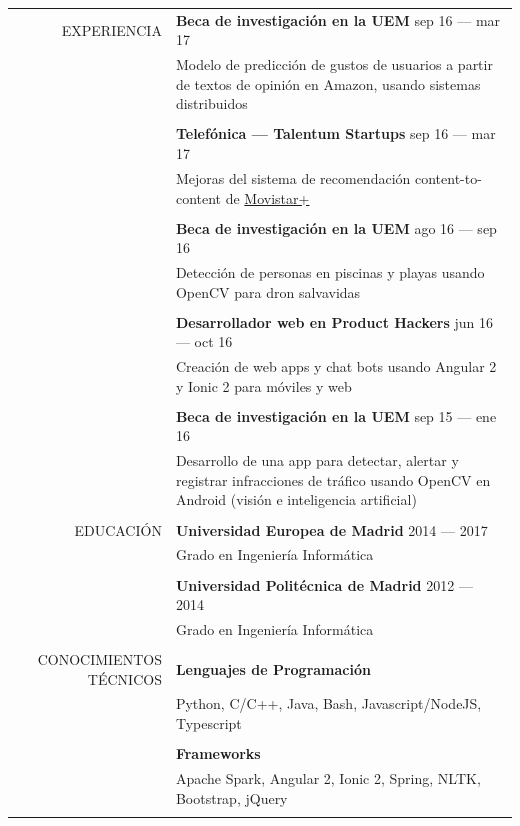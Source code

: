 \documentclass[a4paper, 11pt]{article}
\begin{document}
\begin{longtable}{rp{11cm}}
    EXPERIENCIA
    & {\bf Beca de investigación en la UEM} \hfill sep 16 --- mar 17\\
    & Modelo de predicción de gustos de usuarios a partir de textos de opinión en Amazon, usando sistemas distribuidos\\
    \\
    & {\bf Telefónica --- Talentum Startups} \hfill sep 16 --- mar 17\\
    & Mejoras del sistema de recomendación content-to-content de \href{http://ver.movistarplus.es/}{Movistar+}\\
    \\
    & {\bf Beca de investigación en la UEM} \hfill ago 16 --- sep 16\\
    & Detección de personas en piscinas y playas usando OpenCV para dron salvavidas\\
    \\
    & {\bf Desarrollador web en Product Hackers} \hfill jun 16 --- oct 16\\
    & Creación de web apps y chat bots usando Angular 2 y Ionic 2 para móviles y web\\
    \\
    & {\bf Beca de investigación en la UEM} \hfill sep 15 --- ene 16\\
    & Desarrollo de una app para detectar, alertar y registrar infracciones de tráfico usando OpenCV en Android (visión e inteligencia artificial)\\
    \\
    EDUCACIÓN
    & {\bf Universidad Europea de Madrid} \hfill 2014 --- 2017\\
    & Grado en Ingeniería Informática\\
    \\
    & {\bf Universidad Politécnica de Madrid} \hfill 2012 --- 2014\\
    & Grado en Ingeniería Informática\\
    \\
    CONOCIMIENTOS TÉCNICOS
    & {\bf Lenguajes de Programación}\\
    & Python, C/C++, Java, Bash, Javascript/NodeJS, Typescript\\
    \\
    & {\bf Frameworks}\\
    & Apache Spark, Angular 2, Ionic 2, Spring, NLTK, Bootstrap, jQuery\\
    \\

\end{longtable}
\end{document}
